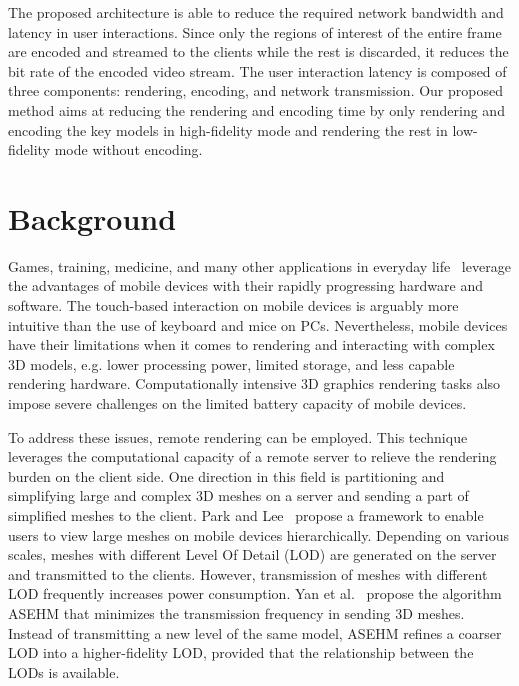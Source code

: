 The proposed architecture is able to reduce the required network bandwidth and latency in user interactions.
Since only the regions of interest of the entire frame are encoded and streamed to the clients while the rest is discarded, it reduces the bit rate of the encoded video stream.
The user interaction latency is composed of three components: rendering, encoding, and network transmission. Our proposed method aims at reducing the rendering and encoding time by only rendering and encoding the key models in high-fidelity mode and rendering the rest in low-fidelity mode without encoding.

\section{Background}
\label{sec:hrr:bg}

Games, training, medicine, and many other applications in everyday life~\cite{ramanathan2007,chun2011,kwon2017,rodriguez-gil2017} leverage the advantages of mobile devices with their rapidly progressing hardware and software.
The touch-based interaction on mobile devices is arguably more intuitive than the use of keyboard and mice on PCs. Nevertheless, mobile devices have their limitations when it comes to rendering and interacting with complex 3D models, e.g. lower processing power, limited storage, and less capable rendering hardware.
Computationally intensive 3D graphics rendering tasks also impose severe challenges on the limited battery capacity of mobile devices.

To address these issues, remote rendering can be employed. This technique leverages the computational capacity of a remote server to relieve the rendering burden on the client side.
One direction in this field is partitioning and simplifying large and complex 3D meshes on a server and sending a part of simplified meshes to the client. Park and Lee~\cite{park2016} propose a framework to enable users to view large meshes on mobile devices hierarchically. Depending on various scales, meshes with different Level Of Detail (LOD) are generated on the server and transmitted to the clients.
However, transmission of meshes with different LOD frequently increases power consumption. Yan et al.~\cite{yan2014} propose the algorithm ASEHM that minimizes the transmission frequency in sending 3D meshes. Instead of transmitting a new level of the same model, ASEHM refines a coarser LOD into a higher-fidelity LOD, provided that the relationship between the LODs is available.

